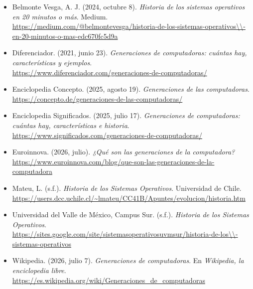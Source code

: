 \documentclass[12pt,letterpaper]{article}
\begin{document}
\begin{itemize}[leftmargin=1.5em,itemsep=8pt]

\item[] Belmonte Vesga, A. J. (2024, octubre 8). \textit{Historia de los sistemas operativos en 20 minutos o más}. Medium. \\ \url{https://medium.com/@belmontevesga/historia-de-los-sistemas-operativos\\-en-20-minutos-o-mas-edc670fc5d9a}

\item[] Diferenciador. (2021, junio 23). \textit{Generaciones de computadoras: cuántas hay, características y ejemplos}. \\ \url{https://www.diferenciador.com/generaciones-de-computadoras/}

\item[] Enciclopedia Concepto. (2025, agosto 19). \textit{Generaciones de las computadoras}. \\ \url{https://concepto.de/generaciones-de-las-computadoras/}

\item[] Enciclopedia Significados. (2025, julio 17). \textit{Generaciones de computadoras: cuántas hay, características e historia}. \\ \url{https://www.significados.com/generaciones-de-computadoras/}

\item[] Euroinnova. (2026, julio). \textit{¿Qué son las generaciones de la computadora?} \\ \url{https://www.euroinnova.com/blog/que-son-las-generaciones-de-la-computadora}

\item[] Mateu, L. (s.f.). \textit{Historia de los Sistemas Operativos}. Universidad de Chile. \\ \url{https://users.dcc.uchile.cl/~lmateu/CC41B/Apuntes/evolucion/historia.htm}

\item[] Universidad del Valle de México, Campus Sur. (s.f.). \textit{Historia de los Sistemas Operativos}. \\ \url{https://sites.google.com/site/sistemasoperativosuvmsur/historia-de-los\\-sistemas-operativos}

\item[] Wikipedia. (2026, julio 7). \textit{Generaciones de computadoras}. En \textit{Wikipedia, la enciclopedia libre}. \\ \url{https://es.wikipedia.org/wiki/Generaciones_de_computadoras}

\end{itemize}
\end{document}
